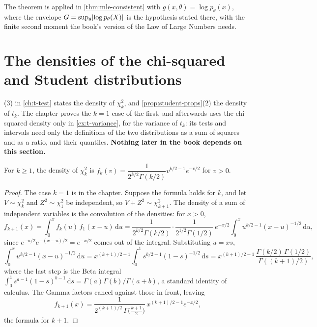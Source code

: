 The theorem is applied in \cref{thm:mle-consistent} with $g(x, \theta) = \log p_\theta(x)$, where the envelope $G = \sup_\theta\lvert\log p_\theta(X)\rvert$ is the hypothesis stated there, with the finite second moment the book's version of the Law of Large Numbers needs.

\section{The densities of the chi-squared and Student distributions}
\label{sec:proof-chisq-density}

(3) in \cref{ch:t-test} states the density of $\chi^2_k$, and \cref{prop:student-props}(2) the density of $t_k$.
The chapter proves the $k = 1$ case of the first, and afterwards uses the chi-squared density only in \cref{ex:t-variance}, for the variance of $t_k$: its tests and intervals need only the definitions of the two distributions as a sum of squares and as a ratio, and their quantiles.
\textbf{Nothing later in the book depends on this section.}

\begin{proposition}
For $k \geq 1$, the density of $\chi^2_k$ is $f_k(v) = \dfrac{1}{2^{k/2}\Gamma(k/2)}v^{k/2 - 1}e^{-v/2}$ for $v > 0$.
\end{proposition}
\begin{proof}
The case $k = 1$ is in the chapter.
Suppose the formula holds for $k$, and let $V \sim \chi^2_k$ and $Z^2 \sim \chi^2_1$ be independent, so $V + Z^2 \sim \chi^2_{k+1}$.
The density of a sum of independent variables is the convolution of the densities: for $x > 0$,
\[
f_{k+1}(x) = \int_0^x f_k(u)\,f_1(x - u)\,\mathrm{d}u = \frac{1}{2^{k/2}\Gamma(k/2)}\cdot\frac{1}{2^{1/2}\Gamma(1/2)}\,e^{-x/2}\int_0^x u^{k/2 - 1}(x - u)^{-1/2}\,\mathrm{d}u,
\]
since $e^{-u/2}e^{-(x-u)/2} = e^{-x/2}$ comes out of the integral.
Substituting $u = xs$,
\[
\int_0^x u^{k/2 - 1}(x - u)^{-1/2}\,\mathrm{d}u = x^{(k+1)/2 - 1}\int_0^1 s^{k/2 - 1}(1 - s)^{-1/2}\,\mathrm{d}s = x^{(k+1)/2 - 1}\,\frac{\Gamma(k/2)\,\Gamma(1/2)}{\Gamma((k+1)/2)},
\]
where the last step is the Beta integral $\int_0^1 s^{a-1}(1-s)^{b-1}\,\mathrm{d}s = \Gamma(a)\Gamma(b)/\Gamma(a+b)$, a standard identity of calculus.
The Gamma factors cancel against those in front, leaving
\[
f_{k+1}(x) = \frac{1}{2^{(k+1)/2}\,\Gamma\big(\frac{k+1}{2}\big)}\,x^{(k+1)/2 - 1}e^{-x/2},
\]
the formula for $k + 1$.
\end{proof}

